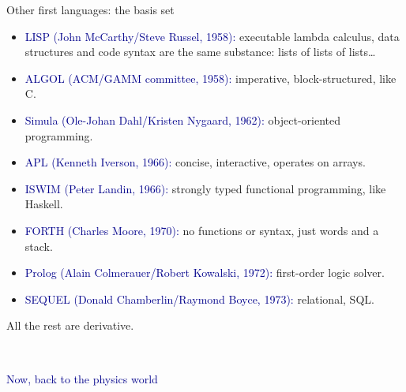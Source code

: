 \documentclass[aspectratio=169]{beamer}
\begin{document}
\begin{frame}{Other first languages: the basis set}
\vspace{0.35 cm}
\begin{itemize}\setlength{\itemsep}{0.3 cm}
\item \textcolor{darkblue}{LISP (John McCarthy/Steve Russel, 1958):} executable lambda calculus, data structures and code syntax are the same substance: lists of lists of lists\ldots

\item \textcolor{darkblue}{ALGOL (ACM/GAMM committee, 1958):} imperative, block-structured, like C.

\item \textcolor{darkblue}{Simula (Ole-Johan Dahl/Kristen Nygaard, 1962):} object-oriented programming.

\item \textcolor{darkblue}{APL (Kenneth Iverson, 1966):} concise, interactive, operates on arrays.

\item \textcolor{darkblue}{ISWIM (Peter Landin, 1966):} strongly typed functional programming, like Haskell.

\item \textcolor{darkblue}{FORTH (Charles Moore, 1970):} no functions or syntax, just words and a stack.

\item \textcolor{darkblue}{Prolog (Alain Colmerauer/Robert Kowalski, 1972):} first-order logic solver.

\item \textcolor{darkblue}{SEQUEL (Donald Chamberlin/Raymond Boyce, 1973):} relational, SQL.
\end{itemize}

\begin{center}
\LARGE
All the rest are derivative.
\end{center}
\end{frame}

\begin{frame}{\mbox{ }}
\LARGE
\begin{center}
\textcolor{darkblue}{Now, back to the physics world}
\end{center}
\end{frame}
\end{document}
